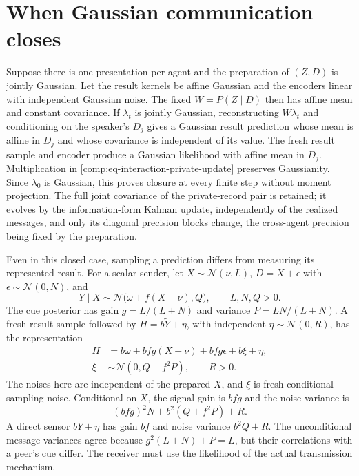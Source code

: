 \section{When Gaussian communication closes}
\label{comp:interaction-gaussian}

Suppose there is one presentation per agent and the preparation of $(Z,D)$ is jointly Gaussian. Let the result kernels be affine Gaussian and the encoders linear with independent Gaussian noise. The fixed $W=P(Z\mid D)$ then has affine mean and constant covariance. If $\lambda_t$ is jointly Gaussian, reconstructing $W\lambda_t$ and conditioning on the speaker's $D_j$ gives a Gaussian result prediction whose mean is affine in $D_j$ and whose covariance is independent of its value. The fresh result sample and encoder produce a Gaussian likelihood with affine mean in $D_j$. Multiplication in \cref{comp:eq-interaction-private-update} preserves Gaussianity. Since $\lambda_0$ is Gaussian, this proves closure at every finite step without moment projection. The full joint covariance of the private-record pair is retained; it evolves by the information-form Kalman update, independently of the realized messages, and only its diagonal precision blocks change, the cross-agent precision being fixed by the preparation.

Even in this closed case, sampling a prediction differs from measuring its represented result. For a scalar sender, let $X\sim\mathcal N(\nu,L)$, $D=X+\epsilon$ with $\epsilon\sim\mathcal N(0,N)$, and
\begin{equation}
Y\mid X\sim\mathcal N\bigl(\omega+f(X-\nu),Q\bigr),
\qquad L,N,Q>0.
\end{equation}
The cue posterior has gain $g=L/(L+N)$ and variance $P=LN/(L+N)$. A fresh result sample followed by $H=b\widetilde Y+\eta$, with independent $\eta\sim\mathcal N(0,R)$, has the representation
\begin{equation}
\begin{aligned}
H&=b\omega+bfg(X-\nu)+bfg\epsilon+b\xi+\eta,\\
\xi&\sim\mathcal N(0,Q+f^2P),\qquad R>0.
\end{aligned}
\end{equation}
The noises here are independent of the prepared $X$, and $\xi$ is fresh conditional sampling noise. Conditional on $X$, the signal gain is $bfg$ and the noise variance is
\begin{equation}
(bfg)^2N+b^2(Q+f^2P)+R.
\end{equation}
A direct sensor $bY+\eta$ has gain $bf$ and noise variance $b^2Q+R$. The unconditional message variances agree because $g^2(L+N)+P=L$, but their correlations with a peer's cue differ. The receiver must use the likelihood of the actual transmission mechanism.


